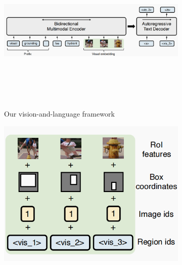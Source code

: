 \documentclass[twocolumn,3p,a4paper,preprint,11pt,margin=2.5cm]{elsarticle}
\begin{document}
\begin{figure}[tp] %
    \centering
    \begin{subfigure}{0.45\textwidth} %
        \centering
        \includegraphics[height=8cm,width=\textwidth]{image/image2.png}
        \caption{Our vision-and-language framework}
        \label{fig:framework}
    \end{subfigure}
    \hfill
    \begin{subfigure}{0.45\textwidth} %
        \centering
        \includegraphics[width=\textwidth]{image/image3.png}

\end{subfigure}
\end{figure}
\end{document}
